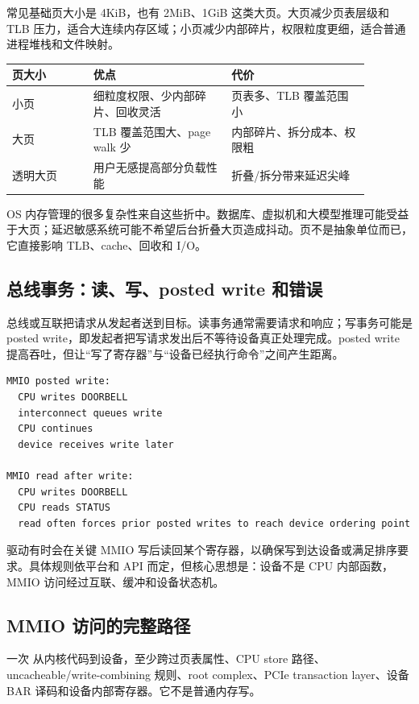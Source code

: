 常见基础页大小是 4KiB，也有 2MiB、1GiB 这类大页。大页减少页表层级和 TLB 压力，适合大连续内存区域；小页减少内部碎片，权限粒度更细，适合普通进程堆栈和文件映射。

\begin{longtable}{p{0.2\linewidth}p{0.34\linewidth}p{0.34\linewidth}}
\toprule
页大小 & 优点 & 代价 \\
\midrule
小页 & 细粒度权限、少内部碎片、回收灵活 & 页表多、TLB 覆盖范围小 \\
大页 & TLB 覆盖范围大、page walk 少 & 内部碎片、拆分成本、权限粗 \\
透明大页 & 用户无感提高部分负载性能 & 折叠/拆分带来延迟尖峰 \\
\bottomrule
\end{longtable}

OS 内存管理的很多复杂性来自这些折中。数据库、虚拟机和大模型推理可能受益于大页；延迟敏感系统可能不希望后台折叠大页造成抖动。页不是抽象单位而已，它直接影响 TLB、cache、回收和 I/O。

\subsection{总线事务：读、写、posted write 和错误}

总线或互联把请求从发起者送到目标。读事务通常需要请求和响应；写事务可能是 posted write，即发起者把写请求发出后不等待设备真正处理完成。posted write 提高吞吐，但让“写了寄存器”与“设备已经执行命令”之间产生距离。

\begin{lstlisting}
MMIO posted write:
  CPU writes DOORBELL
  interconnect queues write
  CPU continues
  device receives write later

MMIO read after write:
  CPU writes DOORBELL
  CPU reads STATUS
  read often forces prior posted writes to reach device ordering point
\end{lstlisting}

驱动有时会在关键 MMIO 写后读回某个寄存器，以确保写到达设备或满足排序要求。具体规则依平台和 API 而定，但核心思想是：设备不是 CPU 内部函数，MMIO 访问经过互联、缓冲和设备状态机。

\subsection{MMIO 访问的完整路径}

一次  从内核代码到设备，至少跨过页表属性、CPU store 路径、uncacheable/write-combining 规则、root complex、PCIe transaction layer、设备 BAR 译码和设备内部寄存器。它不是普通内存写。

